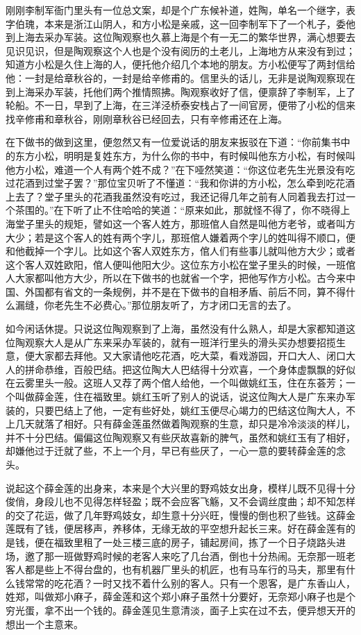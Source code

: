 \documentclass[12pt,UTF8]{ctexbook}
\begin{document}
{{{刚刚李制军衙门里头有一位总文案，却是个广东候补道，姓陶，单名一个继字，表字伯瑰，本来是浙江山阴人，和方小松是亲戚，这一回李制军下了一个札子，委他到上海去采办军装。这位陶观察也久慕上海是个有一无二的繁华世界，满心想要去见识见识，但是陶观察这个人也是个没有阅历的土老儿，上海地方从来没有到过；知道方小松是久住上海的人，便托他介绍几个本地的朋友。方小松便写了两封信给他：一封是给章秋谷的，一封是给辛修甫的。信里头的话儿，无非是说陶观察现在到上海采办军装，托他们两个推情照拂。陶观察收好了信，便禀辞了李制军，上了轮船。不一日，早到了上海，在三洋泾桥泰安栈占了一间官房，便带了小松的信来找辛修甫和章秋谷，刚刚章秋谷已经回去，只有辛修甫还在上海。

在下做书的做到这里，便忽然又有一位爱说话的朋友来扳驳在下道：“你前集书中的东方小松，明明是复姓东方，为什么你的书中，有时候叫他东方小松，有时候叫他方小松，难道一个人有两个姓不成？”在下哑然笑道：“你这位老先生光景没有吃过花酒到过堂子罢？”那位宝贝听了不懂道：“我和你讲的方小松，怎么牵到吃花酒上去了？堂子里头的花酒我虽然没有吃过，我还记得几年之前有人同着我去打过一个茶围的。”在下听了止不住哈哈的笑道：“原来如此，那就怪不得了，你不晓得上海堂子里头的规矩，譬如这一个客人姓方，那班倌人自然是叫他方老爷，或者叫方大少；若是这个客人的姓有两个字儿，那班倌人嫌着两个字儿的姓叫得不顺口，便和他截掉一个字儿。比如这个客人双姓东方，倌人们有些事儿就叫他方大少；或者这个客人双姓欧阳，倌人便叫他阳大少。这位东方小松在堂子里头的时候，一班倌人大家都叫他方大少，所以在下做书的也就省一个字，把他写作方小松。古今来中国、外国都有省文的一条规例，并不是在下做书的自相矛盾、前后不同，算不得什么漏缝，你老先生不必费心。”那位朋友听了，方才闭口无言的去了。

如今闲话休提。只说这位陶观察到了上海，虽然没有什么熟人，却是大家都知道这位陶观察大人是从广东来采办军装的，就有一班洋行里头的滑头买办想要招揽生意，便大家都去拜他。又大家请他吃花酒，吃大菜，看戏游园，开口大人、闭口大人的拼命恭维，百般巴结。把这位陶大人巴结得十分欢喜，一个身体虚飘飘的好似在云雾里头一般。这班人又荐了两个倌人给他，一个叫做姚红玉，住在东荟芳；一个叫做薛金莲，住在福致里。姚红玉听了别人的说话，说这位陶大人是广东来办军装的，只要巴结上了他，一定有些好处，姚红玉便尽心竭力的巴结这位陶大人，不上几天就落了相好。只有薛金莲虽然做着陶观察的生意，却只是冷冷淡淡的样儿，并不十分巴结。偏偏这位陶观察又有些厌故喜新的脾气，虽然和姚红玉有了相好，却嫌他过于迁就了些，不上一个月，早已有些厌了，一心一意的要转薛金莲的念头。

说起这个薛金莲的出身来，本来是个大兴里的野鸡妓女出身，模样儿既不见得十分俊俏，身段儿也不见得怎样轻盈；既不会应客飞觞，又不会调丝度曲；却不知怎样的交了花运，做了几年野鸡妓女，却生意十分兴旺，慢慢的倒也积了些钱。这薛金莲既有了钱，便居移声，养移体，无缘无故的平空想升起长三来。好在薛金莲有的是钱，便在福致里租了一处三楼三底的房子，铺起房间，拣了一个日子烧路头进场，邀了那一班做野鸡时候的老客人来吃了几台酒，倒也十分热闹。无奈那一班老客人都是些上不得台盘的，也有机器厂里头的机匠，也有马车行的马夫，那里有什么钱常常的吃花酒？一时又找不着什么别的客人。只有一个恩客，是广东香山人，姓郑，叫做郑小麻子，薛金莲和这个郑小麻子虽然十分要好，无奈郑小麻子也是个穷光蛋，拿不出一个钱的。薛金莲见生意清淡，面子上实在过不去，便异想天开的想出一个主意来。

}}}
\end{document}
